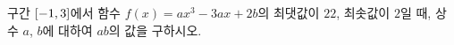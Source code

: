 구간 $[-1{,}\mkern3mu\mathopen{}3]$에서 함수 $f(x)=ax^3-3ax+2b$의 최댓값이 $22$, 최솟값이 $2$일 때, 상수 $a$, $b$에 대하여 $ab$의 값을 구하시오. 
